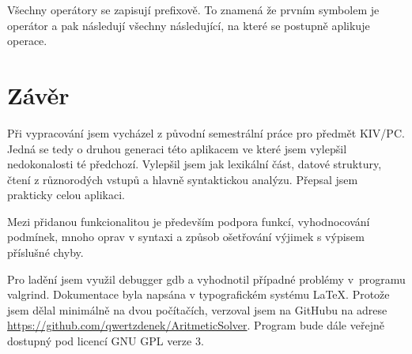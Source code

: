 \documentclass[a4paper, 12pt]{article}
\begin{document}
Všechny operátory se zapisují prefixově. To znamená že prvním symbolem je operátor
a pak následují všechny následující, na které se postupně aplikuje operace.

\section{Závěr}
Při vypracování jsem vycházel z původní semestrální práce pro předmět KIV/PC.
Jedná se tedy o druhou generaci této aplikacem ve které jsem vylepšil nedokonalosti
té předchozí. Vylepšil jsem jak lexikální část, datové struktury, čtení z
různorodých vstupů a hlavně syntaktickou analýzu. Přepsal jsem prakticky
celou aplikaci.

Mezi přidanou funkcionalitou je především podpora funkcí, vyhodnocování podmínek,
mnoho oprav v syntaxi a způsob ošetřování výjimek s výpisem příslušné chyby.

Pro ladění jsem využil debugger \textsf{gdb} a vyhodnotil případné problémy v~programu
\textsf{valgrind}. Dokumentace byla napsána v typografickém systému
\LaTeX{}. Protože jsem dělal minimálně na dvou počítačích, verzoval jsem
na GitHubu na adrese
\url{https://github.com/qwertzdenek/AritmeticSolver}. Program bude dále
veřejně dostupný pod licencí GNU GPL verze 3.


\end{document}
